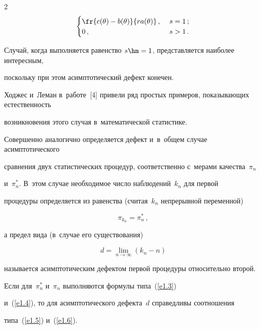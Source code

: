 \begin{multicols}{2}
\begin{equation}
\begin{cases}
\fr{c(\theta) - b(\theta)}{r a(\theta)}\,,&\  s = 1\,;\\


0\,,&\  s > 1\,.


\end{cases}


\label{e1.6}


\end{equation}


Случай, когда выполняется равенство $s\hm = 1$, представляется наиболее интересным, 


поскольку при этом асимптотический дефект конечен.


Ходжес и~Леман в~работе~[4] привели ряд простых примеров, показывающих естественность 


возникновения этого случая в~математической статистике.





Совершенно аналогично определяется дефект и~в~общем случае асимптотического 


сравнения двух статистических процедур, соответственно с~мерами качества~$\pi_{n}$ 


и~$\pi_{n}^*$. В~этом случае необходимое число наблюдений~$k_n$ для первой 


процедуры определяется из равенства (считая~$k_n$ непрерывной переменной)





\noindent


$$


\pi_{k_n} = \pi_n^*\,,


$$


а предел вида (в~случае его существования)





\noindent


$$


d = \lim\limits_{n\to\infty} \left(k_n - n\right)


$$


называется асимптотическим дефектом первой процедуры относительно второй. 


Если для~$\pi_{n}^*$ и~$\pi_{n}$ выполняются формулы типа~(\ref{e1.3}) 


и~(\ref{e1.4}), то для асимптотического дефекта~$d$ справедливы соотношения 


типа~(\ref{e1.5}) и~(\ref{e1.6}).






\end{multicols}
